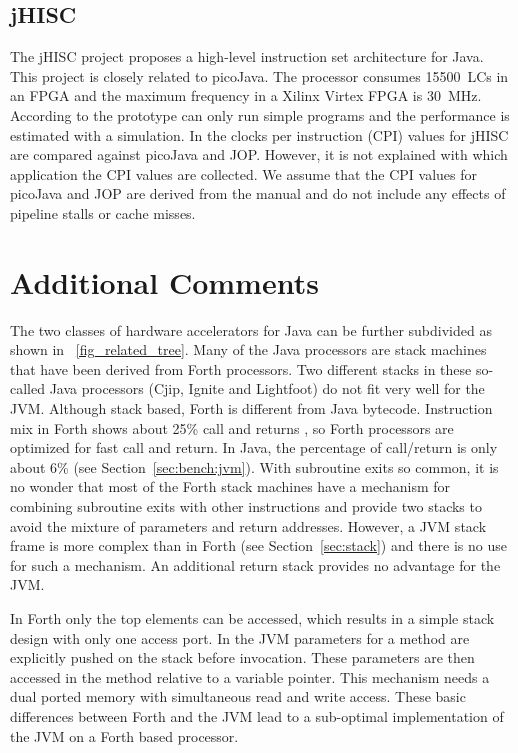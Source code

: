 \subsection{jHISC}

The jHISC project \cite{jHISC:jnl2006} proposes a high-level
instruction set architecture for Java. This project is closely
related to picoJava. The processor consumes 15500~LCs in an FPGA and
the maximum frequency in a Xilinx Virtex FPGA is 30~MHz.
%
%
According to \cite{jHISC:jnl2006} the prototype can only run simple
programs and the performance is estimated with a simulation. In
\cite{jHISC2006} the clocks per instruction (CPI) values for jHISC
are compared against picoJava and JOP. However, it is not explained
with which application the CPI values are collected. We assume that
the CPI values for picoJava and JOP are derived from the manual and
do not include any effects of pipeline stalls or cache misses.

\section{Additional Comments}

The two classes of hardware accelerators for Java can be further
subdivided as shown in \figurename~\ref{fig_related_tree}. Many of
the Java processors are stack machines that have been derived from
Forth processors. Two different stacks in these so-called Java
processors (Cjip, Ignite and Lightfoot) do not fit very well for the
JVM. Although stack based, Forth is different from Java bytecode.
Instruction mix in Forth shows about 25\% call and returns
\cite{Koopman89}, so Forth processors are optimized for fast call
and return. In Java, the percentage of call/return is only about 6\%
(see Section~\ref{sec:bench:jvm}). With subroutine exits so common,
it is no wonder that most of the Forth stack machines have a
mechanism for combining subroutine exits with other instructions and
provide two stacks to avoid the mixture of parameters and return
addresses. However, a JVM stack frame is more complex than in Forth
(see Section~\ref{sec:stack}) and there is no use for such a
mechanism. An additional return stack provides no advantage for the
JVM.

In Forth only the top elements can be accessed, which results in a
simple stack design with only one access port. In the JVM parameters
for a method are explicitly pushed on the stack before invocation.
These parameters are then accessed in the method relative to a
variable pointer. This mechanism needs a dual ported memory with
simultaneous read and write access. These basic differences between
Forth and the JVM lead to a sub-optimal implementation of the JVM on
a Forth based processor.

